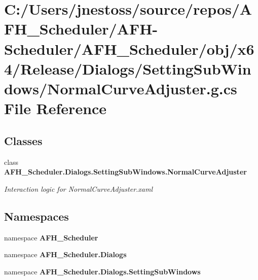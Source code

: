 \section{C\+:/\+Users/jnestoss/source/repos/\+A\+F\+H\+\_\+\+Scheduler/\+A\+F\+H-\/\+Scheduler/\+A\+F\+H\+\_\+\+Scheduler/obj/x64/\+Release/\+Dialogs/\+Setting\+Sub\+Windows/\+Normal\+Curve\+Adjuster.g.\+cs File Reference}
\label{x64_2_release_2_dialogs_2_setting_sub_windows_2_normal_curve_adjuster_8g_8cs}
\subsection*{Classes}
\begin{DoxyCompactItemize}
\item 
class \textbf{ A\+F\+H\+\_\+\+Scheduler.\+Dialogs.\+Setting\+Sub\+Windows.\+Normal\+Curve\+Adjuster}
\begin{DoxyCompactList}\small\item\em Interaction logic for Normal\+Curve\+Adjuster.\+xaml \end{DoxyCompactList}\end{DoxyCompactItemize}
\subsection*{Namespaces}
\begin{DoxyCompactItemize}
\item 
namespace \textbf{ A\+F\+H\+\_\+\+Scheduler}
\item 
namespace \textbf{ A\+F\+H\+\_\+\+Scheduler.\+Dialogs}
\item 
namespace \textbf{ A\+F\+H\+\_\+\+Scheduler.\+Dialogs.\+Setting\+Sub\+Windows}
\end{DoxyCompactItemize}
